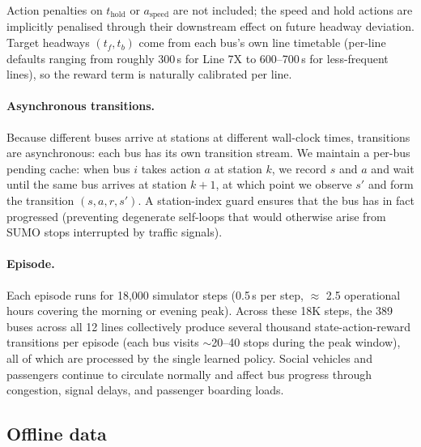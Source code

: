 \documentclass[journal,10pt]{IEEEtran}
\begin{document}
Action penalties on $t_{\text{hold}}$ or $a_{\text{speed}}$ are not included; the speed and hold actions are implicitly penalised through their downstream effect on future headway deviation. Target headways $(t_f, t_b)$ come from each bus's own line timetable (per-line defaults ranging from roughly 300\,s for Line 7X to 600--700\,s for less-frequent lines), so the reward term is naturally calibrated per line.

\paragraph{Asynchronous transitions.} Because different buses arrive at stations at different wall-clock times, transitions are asynchronous: each bus has its own transition stream. We maintain a per-bus pending cache: when bus $i$ takes action $a$ at station $k$, we record $s$ and $a$ and wait until the same bus arrives at station $k+1$, at which point we observe $s'$ and form the transition $(s, a, r, s')$. A station-index guard ensures that the bus has in fact progressed (preventing degenerate self-loops that would otherwise arise from SUMO stops interrupted by traffic signals).

\paragraph{Episode.} Each episode runs for 18{,}000 simulator steps (0.5\,s per step, $\approx$ 2.5 operational hours covering the morning or evening peak). Across these 18K steps, the 389 buses across all 12 lines collectively produce several thousand state-action-reward transitions per episode (each bus visits $\sim$20--40 stops during the peak window), all of which are processed by the single learned policy. Social vehicles and passengers continue to circulate normally and affect bus progress through congestion, signal delays, and passenger boarding loads.

\subsection{Offline data}
\label{sec:offline_data}
\end{document}

